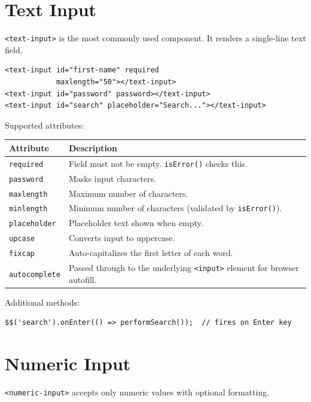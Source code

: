 \section{Text Input}
\label{sec:comp-text}

\texttt{<text-input>} is the most commonly used component.  It renders a single-line text field.

\begin{lstlisting}[style=html]
<text-input id="first-name" required
            maxlength="50"></text-input>
<text-input id="password" password></text-input>
<text-input id="search" placeholder="Search..."></text-input>
\end{lstlisting}

\noindent
Supported attributes:

\begin{longtable}{P{3.8cm}P{6.7cm}}
\toprule
\textbf{Attribute} & \textbf{Description} \\
\midrule
\endhead
\texttt{required} & Field must not be empty.  \texttt{isError()} checks this. \\
\texttt{password} & Masks input characters. \\
\texttt{maxlength} & Maximum number of characters. \\
\texttt{minlength} & Minimum number of characters (validated by \texttt{isError()}). \\
\texttt{placeholder} & Placeholder text shown when empty. \\
\texttt{upcase} & Converts input to uppercase. \\
\texttt{fixcap} & Auto-capitalizes the first letter of each word. \\
\texttt{autocomplete} & Passed through to the underlying \texttt{<input>} element for browser autofill. \\
\bottomrule
\end{longtable}

\noindent
Additional methods:

\begin{lstlisting}[style=javascript]
$$('search').onEnter(() => performSearch());  // fires on Enter key
\end{lstlisting}

\section{Numeric Input}
\label{sec:comp-numeric}

\texttt{<numeric-input>} accepts only numeric values with optional formatting.

